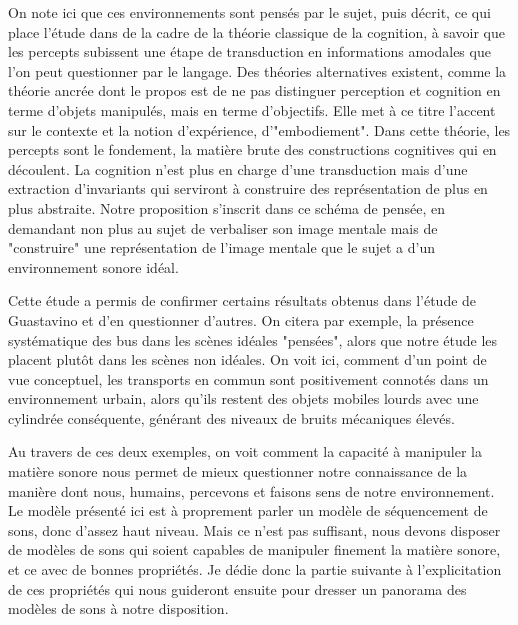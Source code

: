 On note ici que ces environnements sont pensés par le sujet, puis décrit, ce qui place l'étude dans de la cadre de la théorie classique de la cognition, à savoir que les percepts subissent une étape de transduction en informations amodales que l'on peut questionner par le langage. Des théories alternatives existent, comme la théorie ancrée \cite{barsalou2010grounded} dont le propos est de ne pas distinguer perception et cognition en terme d'objets manipulés, mais en terme d'objectifs. Elle met à ce titre l'accent sur le contexte et la notion d'expérience, d'"embodiement". Dans cette théorie, les percepts sont le fondement, la matière brute des constructions cognitives qui en découlent. La cognition n'est plus en charge d'une transduction mais d'une extraction d'invariants qui serviront à construire des représentation de plus en plus abstraite. Notre proposition s'inscrit dans ce schéma de pensée, en demandant non plus au sujet de verbaliser son image mentale mais de "construire" une représentation de l'image mentale que le sujet a d'un environnement sonore idéal.

Cette étude a permis de confirmer certains résultats obtenus dans l'étude de Guastavino \cite{guastavino2006ideal} et d'en questionner d'autres. On citera par exemple, la présence systématique des bus dans les scènes idéales "pensées", alors que notre étude les placent plutôt dans les scènes non idéales. On voit ici, comment d'un point de vue conceptuel, les transports en commun sont positivement connotés dans un environnement urbain, alors qu'ils restent des objets mobiles lourds avec une cylindrée conséquente, générant des niveaux de bruits mécaniques élevés\cite{lafayhal-01300399}.

Au travers de ces deux exemples, on voit comment la capacité à manipuler la matière sonore nous permet de mieux questionner notre connaissance de la manière dont nous, humains, percevons et faisons sens de notre environnement. Le modèle présenté ici est à proprement parler un modèle de séquencement de sons, donc d'assez haut niveau. Mais ce n'est pas suffisant, nous devons disposer de modèles de sons qui soient capables de manipuler finement la matière sonore, et ce avec de bonnes propriétés. Je dédie donc la partie suivante à l'explicitation de ces propriétés qui nous guideront ensuite pour dresser un panorama des modèles de sons à notre disposition.
